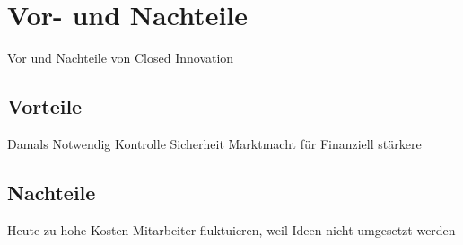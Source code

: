 \section{Vor- und Nachteile}\label{sec:vorNachteile}

Vor und Nachteile von Closed Innovation

\subsection{Vorteile}\label{sec:vorNachteile-vor}

Damals Notwendig
Kontrolle
Sicherheit
Marktmacht für Finanziell stärkere

\subsection{Nachteile}\label{sec:vorNachteile-nach}

Heute zu hohe Kosten
Mitarbeiter fluktuieren, weil Ideen nicht umgesetzt werden